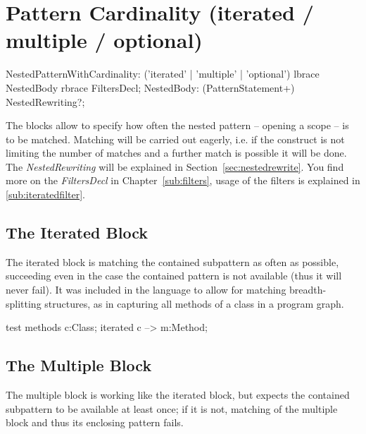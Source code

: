   
\section{Pattern Cardinality (iterated / multiple / optional)}
\label{cardinality}

\begin{rail}  
  NestedPatternWithCardinality: 
    ('iterated' | 'multiple' | 'optional') lbrace NestedBody rbrace FiltersDecl;
  NestedBody: (PatternStatement+) NestedRewriting?;
\end{rail}

The  blocks allow to specify how often the nested pattern -- opening a scope -- is to be matched.
Matching will be carried out eagerly, i.e. if the construct is not limiting the number of matches and a further match is possible it will be done.
The \emph{NestedRewriting} will be explained in Section~\ref{sec:nestedrewrite}.
You find more on the \emph{FiltersDecl} in Chapter~\ref{sub:filters}, usage of the filters is explained in \ref{sub:iteratedfilter}.

\subsection*{The Iterated Block} 
The iterated block is matching the contained subpattern as often as possible, succeeding even in the case the contained pattern is not available (thus it will never fail).
It was included in the language to allow for matching breadth-splitting structures, as in capturing all methods of a class in a program graph.

\begin{example}
  \begin{grgen}
test methods
{
  c:Class;
  iterated {
    c --> m:Method;
  }  
}
  \end{grgen}
\end{example}

\subsection*{The Multiple Block}
The multiple block is working like the iterated block, but expects the contained subpattern to be available at least once; if it is not, matching of the multiple block and thus its enclosing pattern fails.


